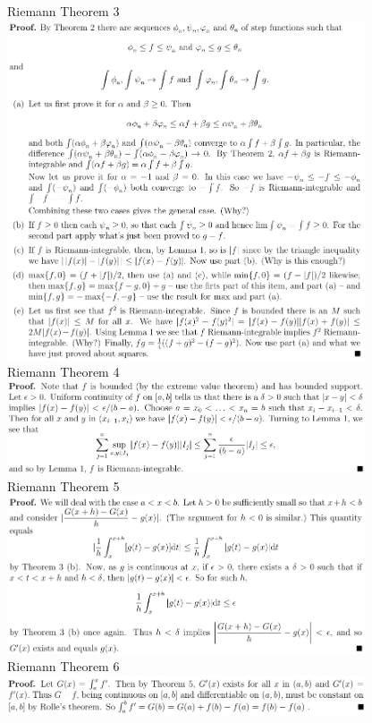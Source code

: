 \documentclass[3pt,landscape]{article}
\begin{document}
\begin{multicols}{2}
    Riemann Theorem 3
    \includegraphics[width=400]{R_t3.png} \\
    Riemann Theorem 4
    \includegraphics[width=400]{R_t4.png} \\
    Riemann Theorem 5
    \includegraphics[width=400]{R_t5.png} \\
    Riemann Theorem 6
    \includegraphics[width=400]{R_t6.png} \\

\end{multicols}
\end{document}
